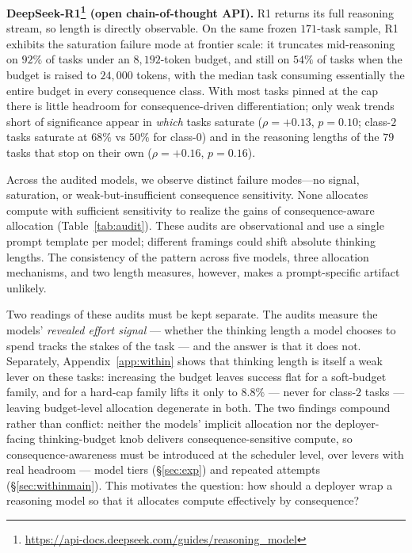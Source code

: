 \documentclass{article}
\begin{document}
\textbf{DeepSeek-R1\footnote{\url{https://api-docs.deepseek.com/guides/reasoning_model}} (open chain-of-thought API).} R1 returns its
full reasoning stream, so length is directly observable. On the same
frozen $171$-task sample, R1 exhibits the saturation failure mode at
frontier scale: it truncates mid-reasoning on $92\%$ of tasks under
an $8{,}192$-token budget, and still on $54\%$ of tasks when the
budget is raised to $24{,}000$ tokens, with the median task consuming
essentially the entire budget in every consequence class. With most
tasks pinned at the cap there is little headroom for
consequence-driven differentiation; only weak trends short of
significance appear in \emph{which} tasks saturate ($\rho = +0.13$,
$p = 0.10$; class-$2$ tasks saturate at $68\%$ vs $50\%$ for
class-$0$) and in the reasoning lengths of the $79$ tasks that stop
on their own ($\rho = +0.16$, $p = 0.16$).

Across the audited models, we observe distinct failure modes—no signal,
saturation, or weak-but-insufficient consequence sensitivity. None
allocates compute with sufficient sensitivity to realize the gains of
consequence-aware allocation (Table~\ref{tab:audit}). These audits are
observational and use a single prompt template per model; different
framings could shift absolute thinking lengths. The consistency of the
pattern across five models, three allocation mechanisms, and two length
measures, however, makes a prompt-specific artifact unlikely.

Two readings of these audits must be kept separate. The audits
measure the models' \emph{revealed effort signal} --- whether the
thinking length a model chooses to spend tracks the stakes of the
task --- and the answer is that it does not. Separately,
Appendix~\ref{app:within} shows that thinking length is itself a
weak lever on these tasks: increasing the budget leaves success flat
for a soft-budget family, and for a hard-cap family lifts it only to
$8.8\%$ --- never for class-$2$ tasks --- leaving budget-level
allocation degenerate in both. The two
findings compound rather than conflict: neither the models' implicit
allocation nor the deployer-facing thinking-budget knob delivers
consequence-sensitive compute, so consequence-awareness must be
introduced at the scheduler level, over levers with real headroom ---
model tiers (\S\ref{sec:exp}) and repeated attempts
(\S\ref{sec:withinmain}). This motivates the question: how should
a deployer wrap a reasoning model so that it allocates compute
effectively by consequence?
\end{document}
